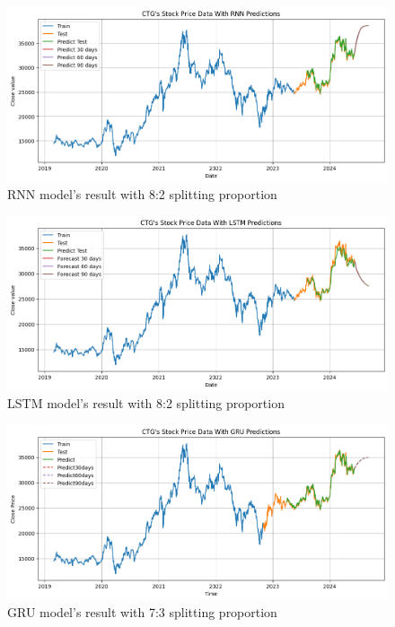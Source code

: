 \documentclass{ieeeojies}
\begin{document}
\begin{figure}[H]
  \centering
  \begin{minipage}{0.8\linewidth}
    \centering
    \includegraphics[width=\linewidth]{bibliography/CTG-RNN-8-2.png}
    \caption{RNN model's result with 8:2 splitting proportion}
    \label{fig24}
  \end{minipage}
\end{figure}
\begin{figure}[H]
  \centering
  \begin{minipage}{0.8\linewidth}
    \centering
    \includegraphics[width=\linewidth]{bibliography/CTG-LSTM-8-2.png}
    \caption{LSTM model's result with 8:2 splitting proportion}
    \label{fig8}
  \end{minipage}
\end{figure}
\begin{figure}[H]
  \centering
  \begin{minipage}{0.8\linewidth}
    \centering
    \includegraphics[width=\linewidth]{bibliography/CTG-GRU-7-3.png}
    \caption{GRU model's result with 7:3 splitting proportion}
    \label{fig8}
  \end{minipage}
\end{figure}
\end{document}
